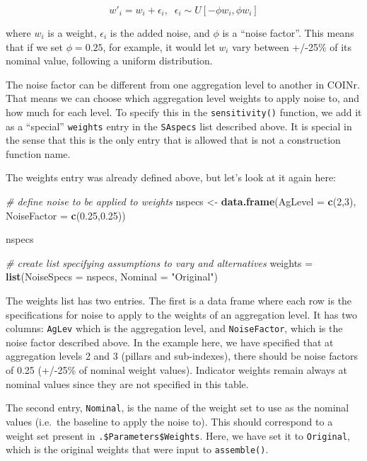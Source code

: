 \documentclass[
]{book}
\newenvironment{Shaded}{\begin{snugshade}}{\end{snugshade}}
\newcommand{\CommentTok}[1]{\textcolor[rgb]{0.56,0.35,0.01}{\textit{#1}}}
\newcommand{\DataTypeTok}[1]{\textcolor[rgb]{0.13,0.29,0.53}{#1}}
\newcommand{\DecValTok}[1]{\textcolor[rgb]{0.00,0.00,0.81}{#1}}
\newcommand{\FloatTok}[1]{\textcolor[rgb]{0.00,0.00,0.81}{#1}}
\newcommand{\KeywordTok}[1]{\textcolor[rgb]{0.13,0.29,0.53}{\textbf{#1}}}
\newcommand{\NormalTok}[1]{#1}
\newcommand{\StringTok}[1]{\textcolor[rgb]{0.31,0.60,0.02}{#1}}
\begin{document}
\[ w'_i = w_i + \epsilon_i, \; \; \epsilon_i \sim U[-\phi w_i, \phi w_i] \]

where \(w_i\) is a weight, \(\epsilon_i\) is the added noise, and \(\phi\) is a ``noise factor''. This means that if we set \(\phi = 0.25\), for example, it would let \(w_i\) vary between +/-25\% of its nominal value, following a uniform distribution.

The noise factor can be different from one aggregation level to another in COINr. That means we can choose which aggregation level weights to apply noise to, and how much for each level. To specify this in the \texttt{sensitivity()} function, we add it as a ``special'' \texttt{weights} entry in the \texttt{SAspecs} list described above. It is special in the sense that this is the only entry that is allowed that is not a construction function name.

The weights entry was already defined above, but let's look at it again here:

\begin{Shaded}
\begin{Highlighting}[]
\CommentTok{# define noise to be applied to weights}
\NormalTok{nspecs <-}\StringTok{ }\KeywordTok{data.frame}\NormalTok{(}\DataTypeTok{AgLevel =} \KeywordTok{c}\NormalTok{(}\DecValTok{2}\NormalTok{,}\DecValTok{3}\NormalTok{), }\DataTypeTok{NoiseFactor =} \KeywordTok{c}\NormalTok{(}\FloatTok{0.25}\NormalTok{,}\FloatTok{0.25}\NormalTok{))}

\NormalTok{nspecs}

\CommentTok{# create list specifying assumptions to vary and alternatives}
\NormalTok{weights =}\StringTok{ }\KeywordTok{list}\NormalTok{(}\DataTypeTok{NoiseSpecs =}\NormalTok{ nspecs,}
               \DataTypeTok{Nominal =} \StringTok{"Original"}\NormalTok{)}
\end{Highlighting}
\end{Shaded}

The weights list has two entries. The first is a data frame where each row is the specifications for noise to apply to the weights of an aggregation level. It has two columns: \texttt{AgLev} which is the aggregation level, and \texttt{NoiseFactor}, which is the noise factor described above. In the example here, we have specified that at aggregation levels 2 and 3 (pillars and sub-indexes), there should be noise factors of 0.25 (+/-25\% of nominal weight values). Indicator weights remain always at nominal values since they are not specified in this table.

The second entry, \texttt{Nominal}, is the name of the weight set to use as the nominal values (i.e.~the baseline to apply the noise to). This should correspond to a weight set present in \texttt{.\$Parameters\$Weights}. Here, we have set it to \texttt{Original}, which is the original weights that were input to \texttt{assemble()}.
\end{document}
